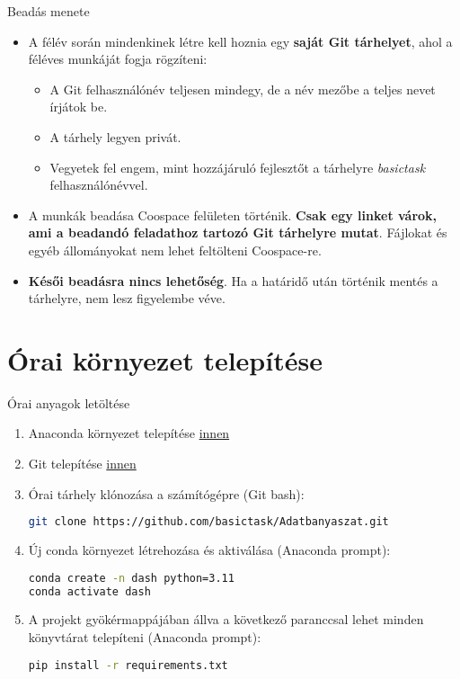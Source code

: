 \documentclass[english, aspectratio=169]{beamer}
\makeatletter
\let\origtableofcontents=\tableofcontents
\def\tableofcontents{\@ifnextchar[{\origtableofcontents}{\gobbletableofcontents}}
\def\gobbletableofcontents#1{\origtableofcontents}
\makeatother
\begin{document}
\begin{frame}{Beadás menete}
	\begin{itemize}
		\item A félév során mindenkinek létre kell hoznia egy \textbf{saját Git tárhelyet}, ahol a féléves munkáját fogja rögzíteni:
		\begin{itemize}
			\item A Git felhasználónév teljesen mindegy, de a név mezőbe a teljes nevet írjátok be. 
			\item A tárhely legyen privát. 
			\item Vegyetek fel engem, mint hozzájáruló fejlesztőt a tárhelyre \emph{basictask} felhasználónévvel. 
		\end{itemize}
		\item A munkák beadása Coospace felületen történik. \textbf{Csak egy linket várok, ami a beadandó feladathoz tartozó Git tárhelyre mutat}. Fájlokat és egyéb állományokat nem lehet feltölteni Coospace-re.
		\item \textbf{Késői beadásra nincs lehetőség}. Ha a határidő után történik mentés a tárhelyre, nem lesz figyelembe véve.
	\end{itemize}
\end{frame}

\section{Órai környezet telepítése}

\begin{frame}{}
	\tableofcontents[currentsection]
\end{frame}

\begin{frame}[fragile]{Órai anyagok letöltése}
	\begin{enumerate}
		\item Anaconda környezet telepítése \href{https://www.anaconda.com/download}{innen}
		\item Git telepítése \href{https://git-scm.com/downloads}{innen}
		\item Órai tárhely klónozása a számítógépre (Git bash):
		\begin{lstlisting}[language=bash]
git clone https://github.com/basictask/Adatbanyaszat.git
		\end{lstlisting}
		\item Új conda környezet létrehozása és aktiválása (Anaconda prompt):
		\begin{lstlisting}[language=bash]
conda create -n dash python=3.11
conda activate dash
		\end{lstlisting}
		\item A projekt gyökérmappájában állva a következő paranccsal lehet minden könyvtárat telepíteni (Anaconda prompt):
		\begin{lstlisting}[language=bash]
pip install -r requirements.txt
		\end{lstlisting}
	\end{enumerate}
\end{frame}
\end{document}
